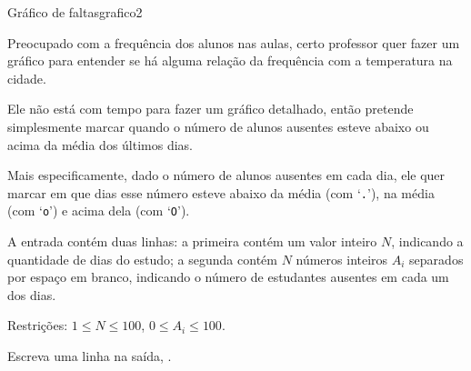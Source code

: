 \documentclass[12pt,a4paper,oneside]{article}
\begin{document}
\begin{problem}{Gráfico de faltas}{grafico}{2}

Preocupado com a frequência dos alunos nas aulas, certo professor quer fazer um gráfico para entender se há alguma relação da frequência com a temperatura na cidade.

Ele não está com tempo para fazer um gráfico detalhado, então pretende simplesmente marcar quando o número de alunos ausentes esteve abaixo ou acima da média dos últimos dias.

Mais especificamente, dado o número de alunos ausentes em cada dia,
ele quer marcar em que dias esse número esteve abaixo da média (com `\texttt{.}'), na média  (com `\texttt{o}') e acima dela (com `\texttt{O}').

%

\InputFile

A entrada contém duas linhas: a primeira contém um valor inteiro $N$, indicando a quantidade de dias do estudo;
a segunda contém $N$ números inteiros $A_i$ separados por espaço em branco, indicando o número de estudantes ausentes em cada um dos dias.

Restrições: $1 \leq N \leq 100$, $0 \leq A_i \leq 100$.

\OutputFile

Escreva uma linha na saída, .


\Example

\begin{example}
%
\end{example}

\begin{example}
%
\end{example}

\begin{example}
%
\end{example}

\begin{example}
%
\end{example}


\end{problem}
\end{document}
